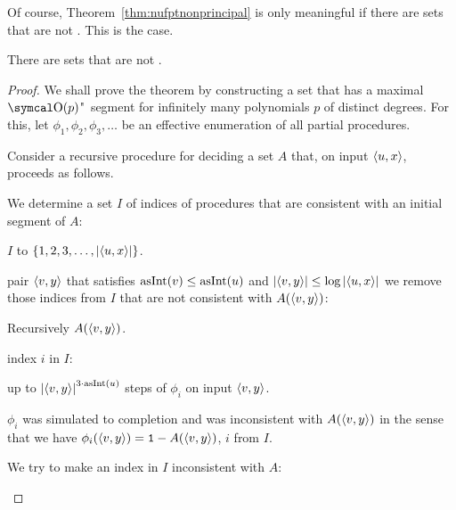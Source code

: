 Of course, Theorem~\ref{thm:nufptnonprincipal} is only meaningful if there are  sets that are not .
This is the case.
\begin{theorem}
  There are  sets that are not .
\end{theorem}
\begin{proof}
  We shall prove the theorem by constructing a  set that has a maximal $\bigO(p)$"~segment for infinitely many polynomials $p$ of distinct degrees.
  For this, let $\phi_1, \phi_2, \phi_3, \ldots$ be an effective enumeration of all partial procedures.

  Consider a recursive procedure for deciding a set $A$ that, on input ${\langle u, x\rangle}$, proceeds as follows.
  \begin{codelisting}
  \item
    We determine a set $I$ of indices of procedures that are consistent with an initial segment of $A$:
    \begin{codelisting}
    \item
       $I$ to $\{1, 2, 3, \ldots, \length{\pair{u}{x}}\}$.
    \item
       pair $\pair{v}{y}$ that satisfies $\asNat(v) \le \asNat(u)$ and $\length{\pair{v}{y}} \le \log \length{\pair{u}{x}}$ we remove those indices from $I$ that are not consistent with $A(\pair{v}{y})$:
      \begin{codelisting}
      \item
        Recursively  $A(\pair{v}{y})$.
      \item
         index $i$ in $I$:
        \begin{codelisting}
        \item
           up to $\length{\pair{v}{y}}^{3 \cdot \asNat(u)}$ steps of $\phi_i$ on input $\pair{v}{y}$.
        \item
           $\phi_i$ was simulated to completion and was inconsistent with $A(\pair{v}{y})$ in the sense that we have $\phi_i(\pair{v}{y}) = \bits{1} - A(\pair{v}{y})$,
          \itemcont {} $i$ from $I$.
        \end{codelisting}
      \end{codelisting}
    \end{codelisting}
  \item
    We try to make an index in $I$ inconsistent with $A$:
    \begin{codelisting}

\end{codelisting}
\end{codelisting}
\end{proof}
